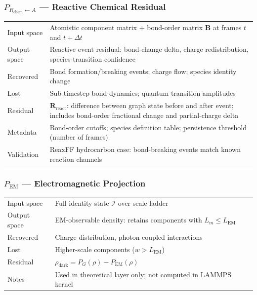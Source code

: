 \documentclass[11pt, a4paper, oneside]{article}
\newcommand{\Resid}[1]{\mathbf{R}_{#1}}
\newcommand{\DarkDens}{\rho_{\mathrm{dark}}}
\begin{document}
\begin{appendices}
\vspace{1em}

\subsubsection*{$P_{R_\mathrm{chem} \leftarrow A}$ --- Reactive Chemical Residual}

\begin{tabularx}{\linewidth}{l X}
  \toprule
  Input space & Atomistic component matrix + bond-order matrix $\mathbf{B}$
	at frames $t$ and $t + \Delta t$ \\
  Output space & Reactive event residual: bond-change delta,
	charge redistribution, species-transition confidence \\
  Recovered & Bond formation/breaking events; charge flow; species
	identity change \\
  Lost & Sub-timestep bond dynamics; quantum transition amplitudes \\
  Residual & $\Resid{\mathrm{react}}$: difference between
	graph state before and after event; includes bond-order
	fractional change and partial-charge delta \\
  Metadata & Bond-order cutoffs; species definition table;
	persistence threshold (number of frames) \\
  Validation & ReaxFF hydrocarbon case: bond-breaking events match
	known reaction channels \\
  \bottomrule
\end{tabularx}

\vspace{1em}

\subsubsection*{$P_{\mathrm{EM}}$ --- Electromagnetic Projection}

\begin{tabularx}{\linewidth}{l X}
  \toprule
  Input space & Full identity state $\mathcal{I}$ over scale ladder \\
  Output space & EM-observable density:
	retains components with $L_m \leq L_{\mathrm{EM}}$ \\
  Recovered & Charge distribution, photon-coupled interactions \\
  Lost & Higher-scale components ($w > L_{\mathrm{EM}}$) \\
  Residual & $\DarkDens = P_G(\rho) - P_{\mathrm{EM}}(\rho)$ \\
  Notes & Used in theoretical layer only; not computed in LAMMPS kernel \\
  \bottomrule
\end{tabularx}


\end{appendices}
\end{document}
